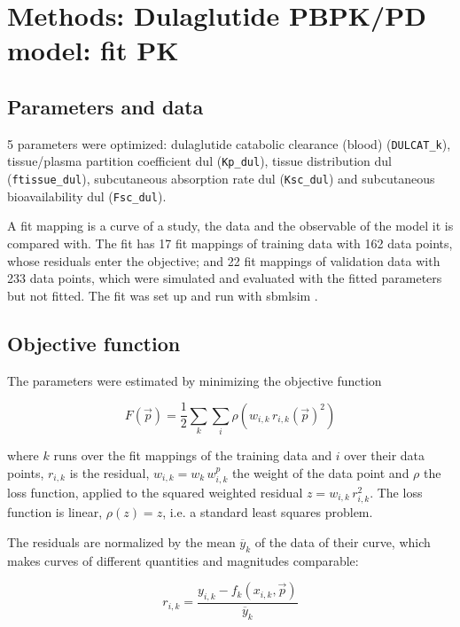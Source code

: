 \section{Methods: Dulaglutide PBPK/PD model: fit PK}

\subsection{Parameters and data}

5 parameters were optimized: dulaglutide catabolic clearance (blood) (\texttt{DULCAT\_k}), tissue/plasma partition coefficient dul (\texttt{Kp\_dul}), tissue distribution dul (\texttt{ftissue\_dul}), subcutaneous absorption rate dul (\texttt{Ksc\_dul}) and subcutaneous bioavailability dul (\texttt{Fsc\_dul}).

A fit mapping is a curve of a study, the data and the observable of the model it is compared with. The fit has 17 fit mappings of training data with 162 data points, whose residuals enter the objective; and 22 fit mappings of validation data with 233 data points, which were simulated and evaluated with the fitted parameters but not fitted. The fit was set up and run with sbmlsim \cite{Koenig2026_sbmlsim}.

\subsection{Objective function}

The parameters were estimated by minimizing the objective function

\begin{equation}
F(\vec{p}) = \frac{1}{2} \sum_{k} \sum_{i} \rho\left(w_{i,k}\, r_{i,k}(\vec{p})^2\right)
\end{equation}

where $k$ runs over the fit mappings of the training data and $i$ over their data points, $r_{i,k}$ is the residual, $w_{i,k} = w_k\, w^{p}_{i,k}$ the weight of the data point and $\rho$ the loss function, applied to the squared weighted residual $z = w_{i,k}\, r_{i,k}^2$. The loss function is linear, $\rho(z) = z$, i.e. a standard least squares problem.

The residuals are normalized by the mean $\overline{y}_k$ of the data of their curve, which makes curves of different quantities and magnitudes comparable:

\begin{equation}
r_{i,k} = \frac{y_{i,k} - f_k(x_{i,k}, \vec{p})}{\overline{y}_k}
\end{equation}

